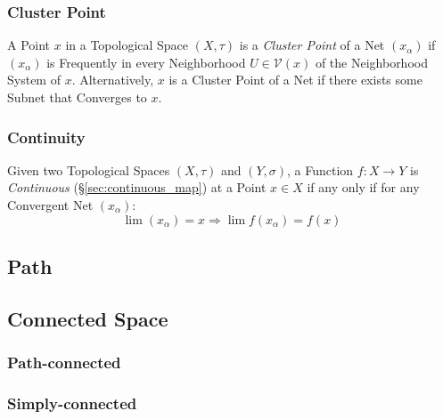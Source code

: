 \subsubsection{Cluster Point}\label{sec:cluster_point}

A Point $x$ in a Topological Space $(X,\tau)$ is a \emph{Cluster
  Point} of a Net $(x_\alpha)$ if $(x_\alpha)$ is Frequently in every
Neighborhood $U \in \mathcal{V}(x)$ of the Neighborhood System of $x$.
Alternatively, $x$ is a Cluster Point of a Net if there exists some
Subnet that Converges to $x$.



\subsubsection{Continuity}\label{sec:net_continuity}

Given two Topological Spaces $(X,\tau)$ and $(Y,\sigma)$, a Function
$f : X \rightarrow Y$ is \emph{Continuous}
(\S\ref{sec:continuous_map}) at a Point $x \in X$ if any only if for
any Convergent Net $(x_\alpha)$:
\[
  \lim (x_\alpha) = x \Rightarrow \lim f(x_\alpha) = f(x)
\]



\subsection{Path}\label{sec:path}

\subsection{Connected Space}\label{sec:connected_space}

\subsubsection{Path-connected}\label{sec:path_connected}

\subsubsection{Simply-connected}\label{sec:simply_connected}



